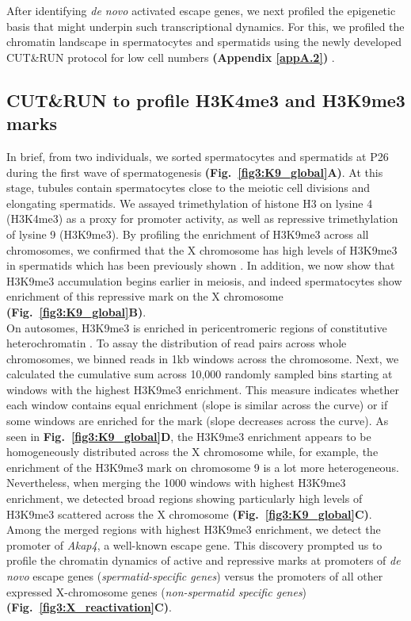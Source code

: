 After identifying \emph{de novo} activated escape genes, we next profiled the epigenetic basis that might underpin such transcriptional dynamics. For this, we profiled the chromatin landscape in spermatocytes and spermatids using the newly developed CUT\&{}RUN protocol for low cell numbers \textbf{(Appendix \ref{appA.2})} \citep{Skene2018}. 

\subsection{CUT\&{}RUN to profile H3K4me3 and H3K9me3 marks}

In brief, from two individuals, we sorted spermatocytes and spermatids at P26 during the first wave of spermatogenesis \textbf{(Fig.~\ref{fig3:K9_global}A)}. At this stage, tubules contain spermatocytes close to the meiotic cell divisions and elongating spermatids. We assayed trimethylation of histone H3 on lysine 4 (H3K4me3) as a proxy for promoter activity, as well as repressive trimethylation of lysine 9 (H3K9me3). By profiling the enrichment of H3K9me3 across all chromosomes, we confirmed that the X chromosome has high levels of H3K9me3 in spermatids which has been previously shown \citep{Moretti2016, Greaves2006, Tachibana2007}. In addition, we now show that H3K9me3 accumulation begins earlier in meiosis, and indeed spermatocytes show enrichment of this repressive mark on the X chromosome \textbf{(Fig.~\ref{fig3:K9_global}B)}. \\

On autosomes, H3K9me3 is enriched in pericentromeric regions of constitutive heterochromatin \citep{Peters2001}. To assay the distribution of read pairs across whole chromosomes, we binned reads in 1kb windows across the chromosome. Next, we calculated the cumulative sum across 10,000 randomly sampled bins starting at windows with the highest H3K9me3 enrichment. This measure indicates whether each window contains equal enrichment (slope is similar across the curve) or if some windows are enriched for the mark (slope decreases across the curve). As seen in \textbf{Fig.~\ref{fig3:K9_global}D}, the H3K9me3 enrichment appears to be homogeneously distributed across the X chromosome while, for example, the enrichment of the H3K9me3 mark on chromosome 9 is a lot more heterogeneous. \\

Nevertheless, when merging the 1000 windows with highest H3K9me3 enrichment, we detected broad regions showing particularly high levels of H3K9me3 scattered across the X chromosome \textbf{(Fig.~\ref{fig3:K9_global}C)}. Among the merged regions with highest H3K9me3 enrichment, we detect the promoter of \textit{Akap4}, a well-known escape gene. This discovery prompted us to profile the chromatin dynamics of active and repressive marks at promoters of \emph{de novo} escape genes (\emph{spermatid-specific genes}) versus the promoters of all other expressed X-chromosome genes (\emph{non-spermatid specific genes}) \textbf{(Fig.~\ref{fig3:X_reactivation}C)}.

